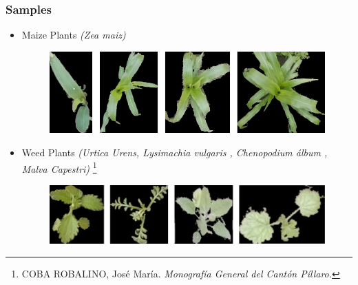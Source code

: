 \documentclass[10pt,a4paper]{beamer}
\begin{document}
\begin{frame}
\frametitle{Samples}
\begin{itemize}
\item Maize Plants \textit{(Zea maiz)}
\begin{figure}[h]
	\centering
	\includegraphics[width=3.5 in]{samplesmaize}
	\label{figure4}
	\end{figure}
	\item Weed Plants \textit{(Urtica Urens, Lysimachia vulgaris , Chenopodium \'album , Malva Capestri)} \footnote{COBA ROBALINO, José María. \textit{Monografía General del Cantón Píllaro.}} %
\begin{figure}[h]
	\centering
	\includegraphics[width=3.5 in]{samplesweed}
	\label{figure4}
	\end{figure}
\end{itemize}
\end{frame}
\end{document}

